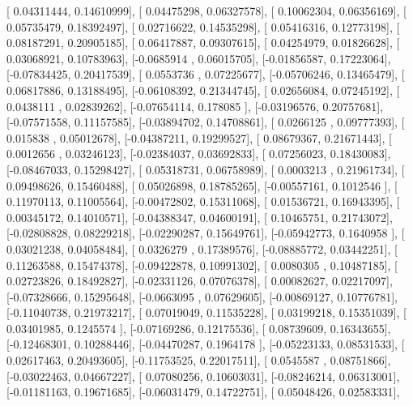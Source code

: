 \documentclass{article}
\begin{document}
       [ 0.04311444,  0.14610999],
       [ 0.04475298,  0.06327578],
       [ 0.10062304,  0.06356169],
       [ 0.05735479,  0.18392497],
       [ 0.02716622,  0.14535298],
       [ 0.05416316,  0.12773198],
       [ 0.08187291,  0.20905185],
       [ 0.06417887,  0.09307615],
       [ 0.04254979,  0.01826628],
       [ 0.03068921,  0.10783963],
       [-0.0685914 ,  0.06015705],
       [-0.01856587,  0.17223064],
       [-0.07834425,  0.20417539],
       [ 0.0553736 ,  0.07225677],
       [-0.05706246,  0.13465479],
       [ 0.06817886,  0.13188495],
       [-0.06108392,  0.21344745],
       [ 0.02656084,  0.07245192],
       [ 0.0438111 ,  0.02839262],
       [-0.07654114,  0.178085  ],
       [-0.03196576,  0.20757681],
       [-0.07571558,  0.11157585],
       [-0.03894702,  0.14708861],
       [ 0.0266125 ,  0.09777393],
       [ 0.015838  ,  0.05012678],
       [-0.04387211,  0.19299527],
       [ 0.08679367,  0.21671443],
       [ 0.0012656 ,  0.03246123],
       [-0.02384037,  0.03692833],
       [ 0.07256023,  0.18430083],
       [-0.08467033,  0.15298427],
       [ 0.05318731,  0.06758989],
       [ 0.0003213 ,  0.21961734],
       [ 0.09498626,  0.15460488],
       [ 0.05026898,  0.18785265],
       [-0.00557161,  0.1012546 ],
       [ 0.11970113,  0.11005564],
       [-0.00472802,  0.15311068],
       [ 0.01536721,  0.16943395],
       [ 0.00345172,  0.14010571],
       [-0.04388347,  0.04600191],
       [ 0.10465751,  0.21743072],
       [-0.02808828,  0.08229218],
       [-0.02290287,  0.15649761],
       [-0.05942773,  0.1640958 ],
       [ 0.03021238,  0.04058484],
       [ 0.0326279 ,  0.17389576],
       [-0.08885772,  0.03442251],
       [ 0.11263588,  0.15474378],
       [-0.09422878,  0.10991302],
       [ 0.0080305 ,  0.10487185],
       [ 0.02723826,  0.18492827],
       [-0.02331126,  0.07076378],
       [ 0.00082627,  0.02217097],
       [-0.07328666,  0.15295648],
       [-0.0663095 ,  0.07629605],
       [-0.00869127,  0.10776781],
       [-0.11040738,  0.21973217],
       [ 0.07019049,  0.11535228],
       [ 0.03199218,  0.15351039],
       [ 0.03401985,  0.1245574 ],
       [-0.07169286,  0.12175536],
       [ 0.08739609,  0.16343655],
       [-0.12468301,  0.10288446],
       [-0.04470287,  0.1964178 ],
       [-0.05223133,  0.08531533],
       [ 0.02617463,  0.20493605],
       [-0.11753525,  0.22017511],
       [ 0.0545587 ,  0.08751866],
       [-0.03022463,  0.04667227],
       [ 0.07080256,  0.10603031],
       [-0.08246214,  0.06313001],
       [-0.01181163,  0.19671685],
       [-0.06031479,  0.14722751],
       [ 0.05048426,  0.02583331],
\end{document}
